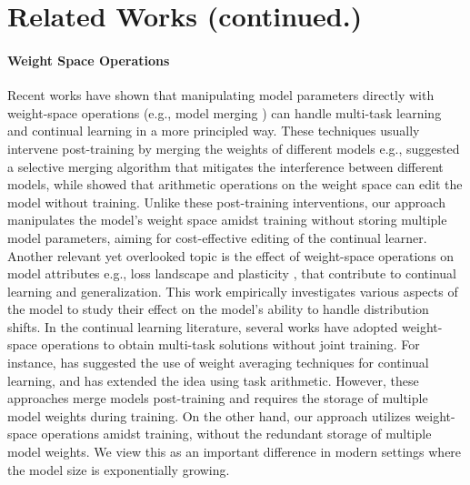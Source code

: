 \section{Related Works (continued.)}
\label{appendix:related-works}

\paragraph{Weight Space Operations} Recent works have shown that manipulating model parameters directly with weight-space operations (e.g., model merging \citep{wortsman2022model}) can handle multi-task learning \cite{yu2024language} and continual learning \citep{marouf2025weighted,marczak2025magmax} in a more principled way. These techniques usually intervene post-training by merging the weights of different models e.g., \citet{yadav2024ties} suggested a selective merging algorithm that mitigates the interference between different models, while \citet{ilharco2022editing} showed that arithmetic operations on the weight space can edit the model without training. Unlike these post-training interventions, our approach manipulates the model's weight space amidst training \citep{izmailov2018averaging,jang2025model} without storing multiple model parameters, aiming for cost-effective editing of the continual learner. Another relevant yet overlooked topic is the effect of weight-space operations on model attributes e.g., loss landscape \citep{li2018visualizing,kaur2023maximum} and plasticity \citep{dohare2024loss}, that contribute to continual learning and generalization. This work empirically investigates various aspects of the model to study their effect on the model's ability to handle distribution shifts. In the continual learning literature, several works have adopted weight-space operations to obtain multi-task solutions without joint training. For instance, \citet{kozal2024continual} has suggested the use of weight averaging techniques for continual learning, and \citet{marczak2025magmax} has extended the idea using task arithmetic. However, these approaches merge models post-training and requires the storage of multiple model weights during training. On the other hand, our approach utilizes weight-space operations amidst training, without the redundant storage of multiple model weights. We view this as an important difference in modern settings where the model size is exponentially growing.